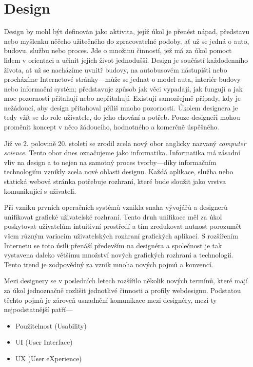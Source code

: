 \chapter{Design}
\label{chap:design}

Design by mohl být definován jako aktivita, jejíž úkol je přenést nápad, představu nebo myšlenku něčeho užitečného do zpracovatelné podoby, ať už se jedná o auto, budovu, službu nebo proces. Jde o množinu činností, jež má za úkol pomoct lidem v orientaci a učinit jejich život jednodušší. Design je součástí každodenního života, ať už se nacházíme uvnitř budovy, na autobusovém nástupišti nebo procházíme Internetové stránky---může se jednat o model auta, interiér budovy nebo informační systém; představuje způsob jak věci vypadají, jak fungují a jak moc pozornosti přitahují nebo nepřitahují. Existují samozřejmě případy, kdy je nežádoucí, aby design přitahoval příliš mnoho pozornosti. Úkolem designera je tedy vžít se do role uživatele, do jeho chování a potřeb. Pouze designeři mohou proměnit koncept v něco žádoucího, hodnotného a komerčně úspěšného.

Již ve 2. polovině 20. století se zrodil zcela nový obor anglicky nazvaný \textit{computer science}. Tento obor dnes označujeme jako informatika. Informatika má zásadní vliv na design a to nejen na samotný proces tvorby---díky informačním technologiím vznikly zcela nové oblasti designu. Každá aplikace, služba nebo statická webová stránka potřebuje rozhraní, které bude sloužit jako vrstva komunikující s uživateli.

Při vzniku prvních operačních systémů vznikla snaha vývojářů a designerů unifikovat grafické uživatelské rozhraní. Tento druh unifikace měl za úkol poskytovat uživatelům intuitivní prostředí a tím zredukovat nutnost porozumět všem různým variacím uživatelských rozhraní grafických aplikací. S rozšířením Internetu se toto úsilí přenáší především na designéra a společnost je tak vystavena daleko většímu množství nových grafických rozhraní a technologií. Tento trend je zodpovědný za vznik mnoha nových pojmů a konvencí.

Mezi designery se v posledních letech rozšířilo několik nových termínů, které mají za úkol jednoznačně rozlišit jednotlivé činnosti a profily webdesignu. Podstatou těchto pojmů je zároveň usnadnění komunikace mezi designéry, mezi ty nejpodstatnější patří---

\begin{itemize}
    \item Použitelnost (Usability)
    \item UI (User Interface)
    \item UX (User eXperience)
\end{itemize}

